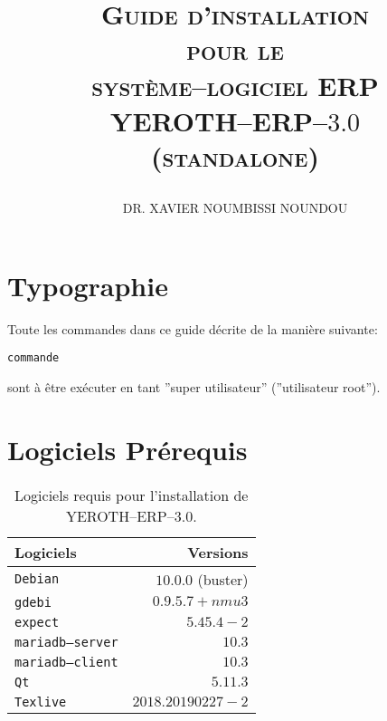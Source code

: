 \documentclass[a4paper, 10pt]{article}
\newcommand{\texlive}{\texttt{Texlive}\xspace}
\newcommand{\gdebi}{\texttt{gdebi}\xspace}
\newcommand{\expect}{\texttt{expect}\xspace}
\newcommand{\debian}{\texttt{Debian}\xspace}
\newcommand{\qt}{\texttt{Qt}\xspace}
\newcommand{\mariadbserver}{\texttt{mariadb--server}\xspace}
\newcommand{\mariadbclient}{\texttt{mariadb--client}\xspace}
\newcommand{\yerotherptroiszero}{\textcolor{yerenColorBlue}{\sc YEROTH--ERP--$3.0$}\xspace}
\newcommand{\yerotherp}{\textcolor{yerenColorBlue}{\sc YEROTH--ERP--$3.0$}\xspace}
\newcommand{\erp}{syst\`eme--logiciel ERP\xspace}
\newcommand{\myfullacademicname}{DR. XAVIER NOUMBISSI NOUNDOU\xspace}
\newcommand{\rootcommand}[1]{
\begin{center}
\textcolor{purplish}{#1\xspace}
\end{center}}
\begin{document}

\title{
\vspace{-1.65em}
\textcolor{medgreen}{\textsc{Guide d'installation \\
										pour le \\
									 \erp \\ \vspace{1em}
									 \yerotherp \\ 
									 \hspace{0.6em} \textcolor{yerenColorBlue}{(standalone)} }}
									 \author{\myfullacademicname}
}

\date{} 
\maketitle
\thispagestyle{fancy}

\vspace{-0.5em}

{}
\begingroup
\tableofcontents
\endgroup


\vspace{0.25cm}

\section{Typographie}

Toute les commandes dans ce guide d\'ecrite
de la mani\`ere suivante:
	\begin{alltt}
		\rootcommand{commande}
	\end{alltt}
sont \`a \^etre ex\'ecuter en tant
''super utilisateur'' (''utilisateur root'').

\section{Logiciels Pr\'erequis}

\begin{table}[!htbp]
\centering
\begin{tabular}{l|r}
\textbf{Logiciels}	&
\textbf{Versions}	\\ \hline
\debian				&
$10.0.0$ (buster)	\\ \hline
\gdebi				&
$0.9.5.7+nmu3$		\\ \hline
\expect				&
$5.45.4-2$			\\ \hline
\mariadbserver		&
$10.3$				\\ \hline
\mariadbclient		&
$10.3$				\\ \hline
\qt					&
$5.11.3$			\\ \hline	
\texlive			&
$2018.20190227-2$	\\ 			
\end{tabular}
\caption{Logiciels requis pour l'installation de \yerotherptroiszero.}
\label{tab:dependance-logiciel}
\end{table}
\end{document}

